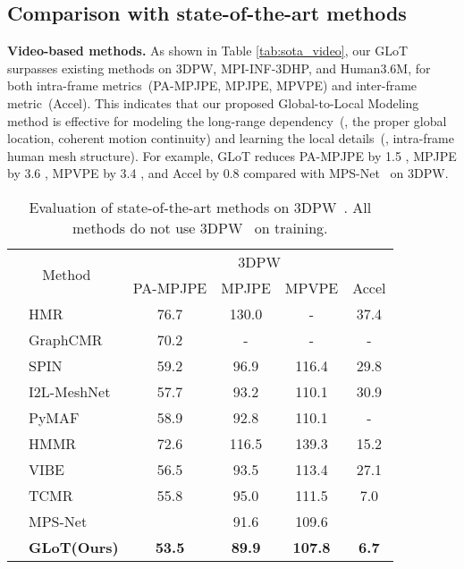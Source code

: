 \documentclass[10pt,twocolumn,letterpaper]{article}
\begin{document}
	\subsection{Comparison with state-of-the-art methods}
	\noindent\textbf{Video-based methods.}
	As shown in Table \ref{tab:sota_video}, our GLoT surpasses existing methods on 3DPW, MPI-INF-3DHP, and Human3.6M, for both intra-frame metrics~(PA-MPJPE, MPJPE, MPVPE) and inter-frame metric~(Accel). This indicates that our proposed Global-to-Local Modeling method is effective for modeling the long-range dependency~(\eg, the proper global location, coherent motion continuity) and learning the local details~(\eg, intra-frame human mesh structure).
	For example, GLoT reduces PA-MPJPE by 1.5  , MPJPE by 3.6 , MPVPE by 3.4 , and Accel by 0.8  compared with MPS-Net~\cite{MPS-net} on 3DPW.
	\begin{table}[t]
		\small
		\setlength{\tabcolsep}{1.2pt}
		\centering
		
\begin{tabular}{ll|cccc}
				\toprule[2pt]
				
				\multicolumn{2}{c}{\multirow{2}{*}{Method}} & \multicolumn{4}{|c}{3DPW} \\
				& & PA-MPJPE  & MPJPE  & MPVPE  & Accel  \\
				\midrule[1pt]
				\midrule[1pt]
				\multirow{5}{*}{\rotatebox[origin=c]{90}{single image}}  & HMR~\cite{HMR} & 76.7 & 130.0 & - & 37.4 \\
				& \cellcolor{Gray}GraphCMR~\cite{GraphCMR} & \cellcolor{Gray}70.2 & \cellcolor{Gray}- & \cellcolor{Gray}- & \cellcolor{Gray}- \\
				& SPIN~\cite{SPIN} &  59.2 & 96.9 & 116.4 & 29.8 \\
				& \cellcolor{Gray}I2L-MeshNet~\cite{moon2020i2l} & \cellcolor{Gray}57.7 & \cellcolor{Gray}93.2 & \cellcolor{Gray}110.1 & \cellcolor{Gray}30.9 \\
				&PyMAF~\cite{zhang2021pymaf} & 58.9 & 92.8 & 110.1 & - \\
				\midrule[1pt]
				\multirow{5}{*}{\rotatebox[origin=c]{90}{video}}
				& HMMR~\cite{Insta} & 72.6 & 116.5 & 139.3 & 15.2 \\
				& \cellcolor{Gray}VIBE~\cite{VIBE} & \cellcolor{Gray}56.5 & \cellcolor{Gray}93.5 & \cellcolor{Gray}113.4 & \cellcolor{Gray}27.1 \\
				& TCMR~\cite{TCMR} & 55.8 & 95.0 & 111.5 & {7.0} \\ 
				& \cellcolor{Gray}MPS-Net~\cite{MPS-net} & \cellcolor{Gray}{54.0} & \cellcolor{Gray}91.6 & \cellcolor{Gray}109.6 & \cellcolor{Gray}{7.5} \\
				& \textbf{GLoT(Ours)} & \textbf{53.5} & \textbf{89.9} & \textbf{107.8} & \textbf{6.7} \\
				
				\bottomrule[1pt]
				
			\end{tabular}\vspace*{-0.5em}
			\caption{
				Evaluation of state-of-the-art methods on 3DPW~\cite{3DPW}. All methods do not use 3DPW~\cite{3DPW} on training.
			}
			\vspace{-0.5 em}
			\label{tab:sota-img-video}
			
		\end{table}
\end{document}
